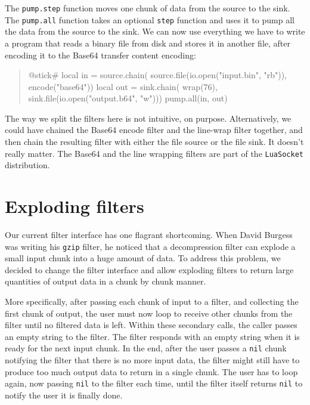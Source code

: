 \documentclass[10pt]{article}
\begin{document}
The \texttt{pump.step} function moves one chunk of data from
the source to the sink. The \texttt{pump.all} function takes
an optional \texttt{step} function and uses it to pump all the
data from the source to the sink. We can now use everything
we have to write a program that reads a binary file from
disk and stores it in another file, after encoding it to the
Base64 transfer content encoding:
\begin{quote}
\begin{lua}
@stick#
local in = source.chain(
  source.file(io.open("input.bin", "rb")), 
  encode("base64"))
local out = sink.chain(
  wrap(76),
  sink.file(io.open("output.b64", "w")))
pump.all(in, out)
%
\end{lua}
\end{quote}

The way we split the filters here is not intuitive, on
purpose.  Alternatively, we could have chained the Base64
encode filter and the line-wrap filter together, and then
chain the resulting filter with either the file source or
the file sink. It doesn't really matter. The Base64 and the
line wrapping filters are part of the \texttt{LuaSocket}
distribution.

\section{Exploding filters}

Our current filter interface has one flagrant shortcoming.
When David Burgess was writing his \texttt{gzip} filter, he
noticed that a decompression filter can explode a small
input chunk into a huge amount of data. To address this
problem, we decided to change the filter interface and allow 
exploding filters to return large quantities of output data 
in a chunk by chunk manner. 

More specifically, after passing each chunk of input to
a filter, and collecting the first chunk of output, the
user must now loop to receive other chunks from the filter until no
filtered data is left. Within these secondary calls, the
caller passes an empty string to the filter. The filter
responds with an empty string when it is ready for the next
input chunk. In the end, after the user passes a
\texttt{nil} chunk notifying the filter that there is no
more input data, the filter might still have to produce too
much output data to return in a single chunk. The user has
to loop again, now passing \texttt{nil} to the filter each time,
until the filter itself returns \texttt{nil} to notify the
user it is finally done.
\end{document}
